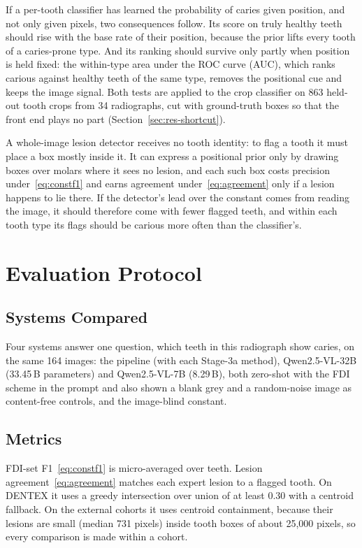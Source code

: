 If a per-tooth classifier has learned the probability of caries given position, and not only given
pixels, two consequences follow. Its score on truly healthy teeth should rise with the base rate of
their position, because the prior lifts every tooth of a caries-prone type. And its ranking should
survive only partly when position is held fixed: the within-type area under the ROC curve (AUC), which
ranks carious against healthy teeth of the same type, removes the positional cue and keeps the image
signal. Both tests are applied to the crop classifier on 863 held-out tooth crops from 34 radiographs,
cut with ground-truth boxes so that the front end plays no part (Section~\ref{sec:res-shortcut}).

A whole-image lesion detector receives no tooth identity: to flag a tooth it must place a box mostly
inside it. It can express a positional prior only by drawing boxes over molars where it sees no lesion,
and each such box costs precision under~\eqref{eq:constf1} and earns agreement
under~\eqref{eq:agreement} only if a lesion happens to lie there. If the detector's lead over the
constant comes from reading the image, it should therefore come with fewer flagged teeth, and within
each tooth type its flags should be carious more often than the classifier's. %

\section{Evaluation Protocol}
\label{sec:method-eval}

\subsection{Systems Compared}

Four systems answer one question, which teeth in this radiograph show caries, on the same 164 images:
the pipeline (with each Stage-3a method), Qwen2.5-VL-32B (33.45\,B parameters) and Qwen2.5-VL-7B
(8.29\,B), both zero-shot with the FDI scheme in the prompt and also shown a blank grey and a
random-noise image as content-free controls, and the image-blind constant.

\subsection{Metrics}

FDI-set F1~\eqref{eq:constf1} is micro-averaged over teeth. Lesion agreement~\eqref{eq:agreement}
matches each expert lesion to a flagged tooth. On DENTEX it uses a greedy intersection over union of at
least 0.30 with a centroid fallback. On the external cohorts it uses centroid containment, because their
lesions are small (median 731 pixels) inside tooth boxes of about 25,000 pixels, so every comparison is
made within a cohort. %

